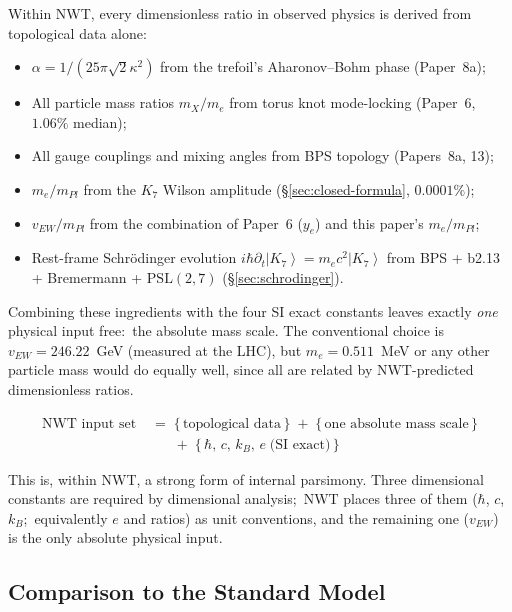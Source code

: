 \documentclass[11pt]{article}
\newcommand{\ket}[1]{\left|#1\right\rangle}
\newcommand{\PSL}{\mathrm{PSL}}
\begin{document}
Within NWT, every dimensionless ratio in observed physics is
derived from topological data alone:
\begin{itemize}
\item $\alpha = 1/(25\pi\sqrt{2}\kappa^2)$ from the trefoil's
  Aharonov--Bohm phase (Paper~8a);
\item All particle mass ratios $m_X/m_e$ from torus knot mode-locking
  (Paper~6, $1.06\%$ median);
\item All gauge couplings and mixing angles from BPS topology
  (Papers~8a, 13);
\item $m_e/m_{Pl}$ from the $K_7$ Wilson amplitude
  (\S\ref{sec:closed-formula}, $0.0001\%$);
\item $v_{EW}/m_{Pl}$ from the combination of Paper~6 ($y_e$) and
  this paper's $m_e/m_{Pl}$;
\item Rest-frame Schr\"odinger evolution
  $i\hbar \partial_t \ket{K_7} = m_e c^2 \ket{K_7}$ from BPS +
  b2.13 + Bremermann + $\PSL(2,7)$ (\S\ref{sec:schrodinger}).
\end{itemize}

Combining these ingredients with the four SI exact constants leaves
exactly \emph{one} physical input free:\ the absolute mass scale.
The conventional choice is $v_{EW} = 246.22$~GeV (measured at the
LHC), but $m_e = 0.511$~MeV or any other particle mass would do
equally well, since all are related by NWT-predicted dimensionless
ratios.

\begin{equation}
  \boxed{\quad
  \begin{aligned}
    \text{NWT input set}\; &= \;\{\,\text{topological data}\,\} \;+\; \{\,\text{one absolute mass scale}\,\} \\
                          &\phantom{=\;} +\;\{\,\hbar,\, c,\, k_B,\, e \;\text{(SI exact)}\,\}
  \end{aligned}
  \quad}
  \label{eq:nwt-input-set}
\end{equation}

This is, within NWT, a strong form of internal parsimony.
Three dimensional constants are required by dimensional analysis;\
NWT places three of them ($\hbar$, $c$, $k_B$;\ equivalently $e$
and ratios) as unit conventions, and the remaining one ($v_{EW}$)
is the only absolute physical input.

\subsection{Comparison to the Standard Model}
\label{sec:sm-comparison}
\end{document}
